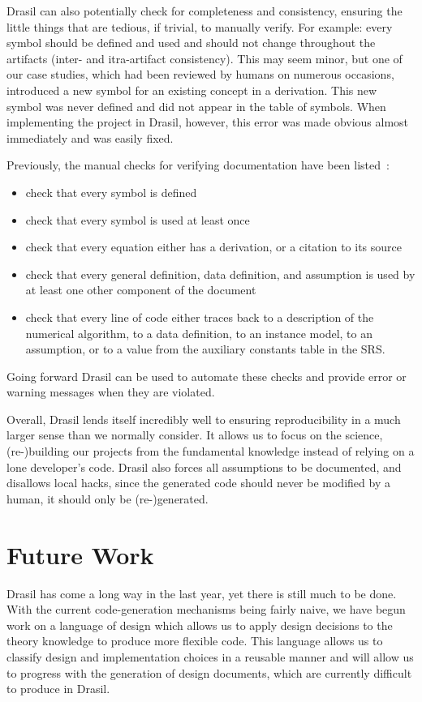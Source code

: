 \documentclass[sigconf]{acmart}
\begin{document}
{Drasil can also potentially check for completeness and consistency, ensuring 
the little things that are tedious, if trivial, to manually verify. For 
example: every symbol should be defined and used and should not change 
throughout the artifacts (inter- and itra-artifact consistency). This may seem 
minor, but one of our case studies, which had been reviewed by humans on 
numerous occasions, introduced a new symbol for an existing concept in a 
derivation. This new symbol was never defined and did not appear in the table of 
symbols. When implementing the project in Drasil, however, this error was made 
obvious almost immediately and was easily fixed.

Previously, the manual checks for verifying documentation have been
listed~\cite{SmithAndKoothoor2016}:
\begin{itemize}
\item check that every symbol is defined
\item check that every symbol is used at least once
\item check that every equation either has a derivation, or a citation to its
  source
\item check that every general definition, data definition, and assumption is
  used by at least one other component of the document
\item check that every line of code either traces back to a description of the
  numerical algorithm, to a data definition, to an instance model, to an
  assumption, or to a value from the auxiliary constants table in the SRS.
\end{itemize}
Going forward Drasil can be used to automate these checks and provide error or
warning messages when they are violated.

Overall, Drasil lends itself incredibly well to ensuring reproducibility in a 
much larger sense than we normally consider. It allows us to focus on the 
science, (re-)building our projects from the fundamental knowledge instead of 
relying on a lone developer's code. Drasil also forces all assumptions to be 
documented, and disallows local hacks, since the generated code should never be 
modified by a human, it should only be (re-)generated.

\section{Future Work} \label{SecFuture}

Drasil has come a long way in the last year, yet there is still much to be 
done. With the current code-generation mechanisms being fairly naive, we have 
begun work on a language of design which allows us to apply design decisions to 
the theory knowledge to produce more flexible code. This language allows us to 
classify design and implementation choices in a reusable manner and will 
allow us to progress with the generation of design documents, which are 
currently difficult to produce in Drasil.

}
\end{document}
